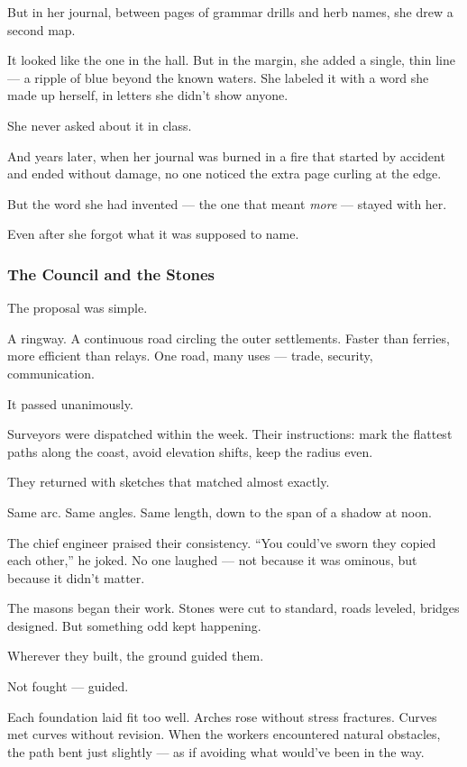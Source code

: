 \documentclass[12pt]{article}
\begin{document}
But in her journal, between pages of grammar drills and herb names, she drew a second map.

It looked like the one in the hall. But in the margin, she added a single, thin line — a ripple of blue beyond the known waters. She labeled it with a word she made up herself, in letters she didn’t show anyone.

She never asked about it in class.

And years later, when her journal was burned in a fire that started by accident and ended without damage, no one noticed the extra page curling at the edge.

But the word she had invented — the one that meant \emph{more} — stayed with her.

Even after she forgot what it was supposed to name.


\dotfill

\subsubsection{The Council and the Stones}

The proposal was simple.

A ringway. A continuous road circling the outer settlements. Faster than ferries, more efficient than relays. One road, many uses — trade, security, communication.

It passed unanimously.

Surveyors were dispatched within the week. Their instructions: mark the flattest paths along the coast, avoid elevation shifts, keep the radius even.

They returned with sketches that matched almost exactly.

Same arc. Same angles. Same length, down to the span of a shadow at noon.

The chief engineer praised their consistency. ``You could’ve sworn they copied each other,'' he joked. No one laughed — not because it was ominous, but because it didn’t matter.

The masons began their work. Stones were cut to standard, roads leveled, bridges designed. But something odd kept happening.

Wherever they built, the ground guided them.

Not fought — guided.

Each foundation laid fit too well. Arches rose without stress fractures. Curves met curves without revision. When the workers encountered natural obstacles, the path bent just slightly — as if avoiding what would’ve been in the way.
\end{document}
